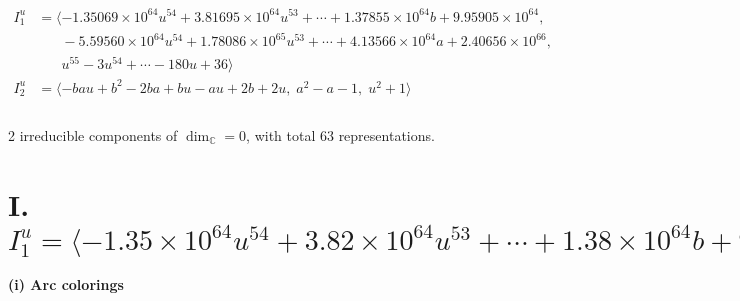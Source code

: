 \documentclass[1p]{elsarticle_modified}
\theoremstyle{definition}
\begin{document}
\begin{align*}
I^u_{1}&=\langle 
-1.35069\times10^{64} u^{54}+3.81695\times10^{64} u^{53}+\cdots+1.37855\times10^{64} b+9.95905\times10^{64},\\
\phantom{I^u_{1}}&\phantom{= \langle  }-5.59560\times10^{64} u^{54}+1.78086\times10^{65} u^{53}+\cdots+4.13566\times10^{64} a+2.40656\times10^{66},\\
\phantom{I^u_{1}}&\phantom{= \langle  }u^{55}-3 u^{54}+\cdots-180 u+36\rangle \\
I^u_{2}&=\langle 
- b a u+b^2-2 b a+b u- a u+2 b+2 u,\;a^2- a-1,\;u^2+1\rangle \\
\\
\end{align*}
\raggedright * 2 irreducible components of $\dim_{\mathbb{C}}=0$, with total 63 representations.\\
\newpage
\renewcommand{\arraystretch}{1}
\centering \section*{I. $I^u_{1}= \langle -1.35\times10^{64} u^{54}+3.82\times10^{64} u^{53}+\cdots+1.38\times10^{64} b+9.96\times10^{64},\;-5.60\times10^{64} u^{54}+1.78\times10^{65} u^{53}+\cdots+4.14\times10^{64} a+2.41\times10^{66},\;u^{55}-3 u^{54}+\cdots-180 u+36 \rangle$}
\flushleft \textbf{(i) Arc colorings}\\
\end{document}
